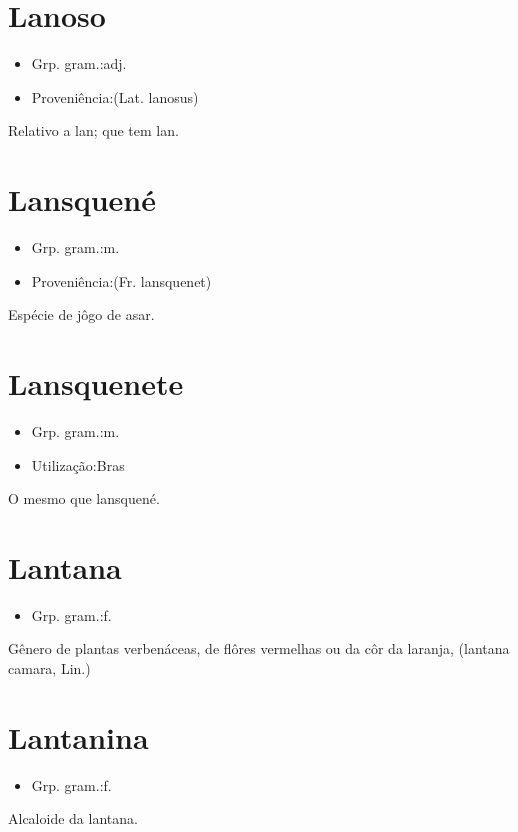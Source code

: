 \section{Lanoso}
\begin{itemize}
\item {Grp. gram.:adj.}
\end{itemize}
\begin{itemize}
\item {Proveniência:(Lat. \textunderscore lanosus\textunderscore )}
\end{itemize}
Relativo a lan; que tem lan.
\section{Lansquené}
\begin{itemize}
\item {Grp. gram.:m.}
\end{itemize}
\begin{itemize}
\item {Proveniência:(Fr. \textunderscore lansquenet\textunderscore )}
\end{itemize}
Espécie de jôgo de asar.
\section{Lansquenete}
\begin{itemize}
\item {Grp. gram.:m.}
\end{itemize}
\begin{itemize}
\item {Utilização:Bras}
\end{itemize}
O mesmo que \textunderscore lansquené\textunderscore .
\section{Lantana}
\begin{itemize}
\item {Grp. gram.:f.}
\end{itemize}
Gênero de plantas verbenáceas, de flôres vermelhas ou da côr da laranja, (\textunderscore lantana camara\textunderscore , Lin.)
\section{Lantanina}
\begin{itemize}
\item {Grp. gram.:f.}
\end{itemize}
Alcaloide da lantana.
